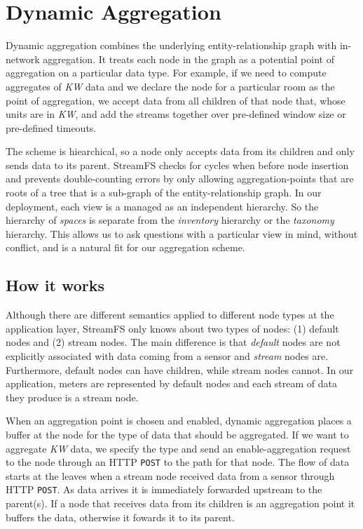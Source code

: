 \section{Dynamic Aggregation}
\label{sec:dynagg}
Dynamic aggregation combines the underlying entity-relationship graph with in-network aggregation.  It treats
each node in the graph as a potential point of aggregation on a particular data type.  For example,
if we need to compute aggregates of \emph{KW} data and we declare the node for a particular room as
the point of aggregation, we accept data from all children of that node that, whose units are in \emph{KW},
and add the streams together over pre-defined window size or pre-defined timeouts.

The scheme is hiearchical, so a node only accepts data from its children and only sends data to its parent.
StreamFS checks for cycles when before node insertion and prevents double-counting errors by only allowing 
aggregation-points that are roots of a tree that is a sub-graph of the entity-relationship graph.  In our deployment,
each view is a managed as an independent hierarchy.  So the hierarchy of \emph{spaces} is separate from
the \emph{inventory} hierarchy or the \emph{taxonomy} hierarchy.  This allows us to ask questions with a particular
view in mind, without conflict, and is a natural fit for our aggregation scheme.

\subsection{How it works}
Although there are different semantics applied to different node types at the application layer, StreamFS only knows
about two types of nodes: (1) default nodes and (2) stream nodes.  The main difference is that \emph{default} nodes
are not explicitly associated with data coming from a sensor and \emph{stream} nodes are.  Furthermore, default
nodes can have children, while stream nodes cannot.  In our application, meters are represented by default nodes
and each stream of data they produce is a stream node.

When an aggregation point is chosen and enabled, dynamic aggregation places a buffer at the node for the type
of data that should be aggregated.  If we want to aggregate \emph{KW} data, we specify the type and send an enable-aggregation
request to the node through an HTTP {\tt POST} to the path for that node.  The flow of data starts at the leaves when
a stream node received data from a sensor through HTTP {\tt POST}.  As data arrives it is immediately
forwarded upstream to the parent(s).  If a node that receives data from its children is an aggregation point it buffers
the data, otherwise it fowards it to its parent.

